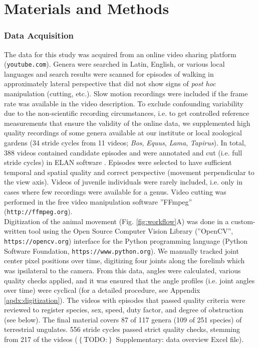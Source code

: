 \documentclass[10pt, a4paper]{article}
\newcommand{\todo}[1]{\colorbox{terracotta!30!yellow}{\footnotesize{$\left\lbrace\text{TODO:}\right\rbrace$ }#1\normalsize}}
\begin{document}
\section*{Materials and Methods}
\begin{linenumbers}[1]
\subsubsection*{Data Acquisition}
The data for this study was acquired from an online video sharing platform (\nolinkurl{youtube.com}). 
Genera were searched in Latin, English, or various local languages and search results were scanned for episodes of walking in approximately lateral perspective that did not show signs of \textit{post hoc} manipulation (cutting, etc.). 
Slow motion recordings were included if the frame rate was available in the video description. 
To exclude confounding variability due to the non-scientific recording circumstances, i.e. to get controlled reference measurements that ensure the validity of the online data, we supplemented high quality recordings of some genera available at our institute or local zoological gardens (34 stride cycles from 11 videos; \textit{Bos}, \textit{Equus}, \textit{Lama}, \textit{Tapirus}). 
In total, 388 videos contained candidate episodes and were annotated and cut (i.e. full stride cycles) in ELAN software \citep[Max Planck Institute for Psycholinguistics, Nijmegen;][]{Brugman2004}. 
Episodes were selected to have sufficient temporal and spatial quality and correct perspective (movement perpendicular to the view axis). 
Videos of juvenile individuals were rarely included, i.e. only in cases where few recordings were available for a genus. 
Video cutting was performed in the free video manipulation software ''FFmpeg'' (\nolinkurl{http://ffmpeg.org}). 
\\Digitization of the animal movement (Fig. \ref{fig:workflow}A) was done in a custom-written tool using the Open Source Computer Vision Library (''OpenCV'', \nolinkurl{https://opencv.org}) interface for the Python programming language (Python Software Foundation, \nolinkurl{https://www.python.org}). 
We manually tracked joint center pixel positions over time, digitizing four joints along the forelimb which was ipsilateral to the camera. 
From this data, angles were calculated, various quality checks applied, and it was ensured that the angle profiles (i.e. joint angles over time) were cyclical (for a detailed procedure, see Appendix \ref{apdx:digitization}). 
The videos with episodes that passed quality criteria were reviewed to register species, sex, speed, duty factor, and degree of obstruction (see below). 
The final material covers 87 of 117 genera (109 of 251 species) of terrestrial ungulates. 
556 stride cycles passed strict quality checks, stemming from 217 of the videos (\todo{Supplementary: data overview} Excel file). 



\end{linenumbers}
\end{document}
